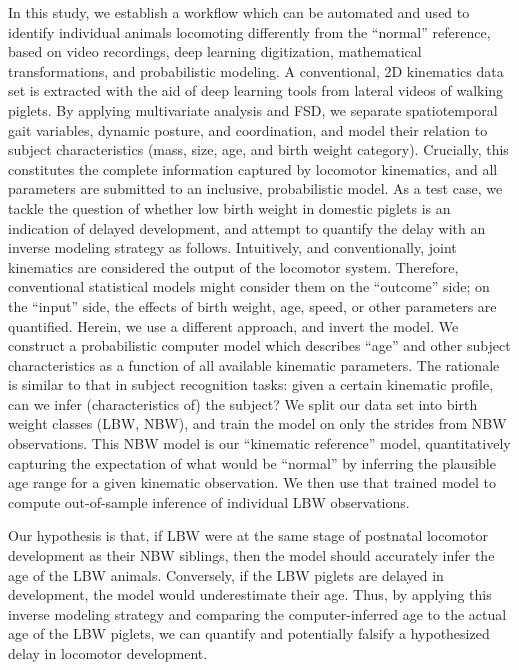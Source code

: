 \documentclass[10pt,a4paper]{article}
\begin{document}
\bigskip
\pagebreak

In this study, we establish a workflow which can be automated and used to identify individual animals locomoting differently from the ``normal'' reference, based on video recordings, deep learning digitization, mathematical transformations, and probabilistic modeling.
A conventional, 2D kinematics data set is extracted with the aid of deep learning tools from lateral videos of walking piglets.
By applying multivariate analysis and FSD, we separate spatiotemporal gait variables, dynamic posture, and coordination, and model their relation to subject characteristics (mass, size, age, and birth weight category).
Crucially, this constitutes the complete information captured by locomotor kinematics, and all parameters are submitted to an inclusive, probabilistic model.
As a test case, we tackle the question of whether low birth weight in domestic piglets is an indication of delayed development, and attempt to quantify the delay with an inverse modeling strategy as follows.
Intuitively, and conventionally, joint kinematics are considered the output of the locomotor system.
Therefore, conventional statistical models might consider them on the ``outcome'' side; on the ``input'' side, the effects of birth weight, age, speed, or other parameters are quantified.
Herein, we use a different approach, and invert the model.
We construct a probabilistic computer model which describes ``age'' and other subject characteristics as a function of all available kinematic parameters.
The rationale is similar to that in subject recognition tasks: given a certain kinematic profile, can we infer (characteristics of) the subject?
We split our data set into birth weight classes (LBW, NBW), and train the model on only the strides from NBW observations.
This NBW model is our ``kinematic reference'' model, quantitatively capturing the expectation of what would be ``normal'' by inferring the plausible age range for a given kinematic observation.
We then use that trained model to compute out-of-sample inference of individual LBW observations.

Our hypothesis is that, if LBW were at the same stage of postnatal locomotor development as their NBW siblings, then the model should accurately infer the age of the LBW animals.
Conversely, if the LBW piglets are delayed in development, the model would underestimate their age.
Thus, by applying this inverse modeling strategy and comparing the computer-inferred age to the actual age of the LBW piglets, we can quantify and potentially falsify a hypothesized delay in locomotor development.
\end{document}
